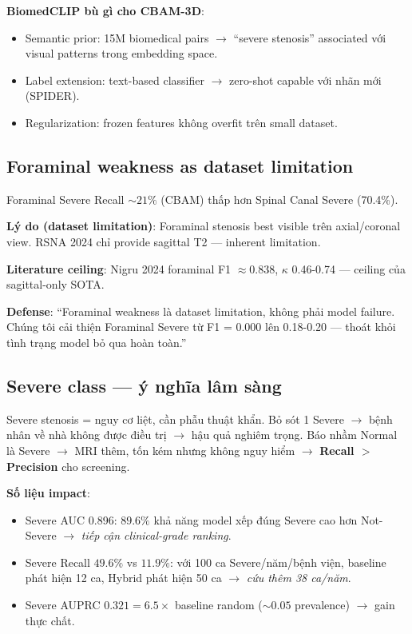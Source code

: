 \documentclass[11pt,a4paper]{article}
\begin{document}
\noindent\textbf{BiomedCLIP bù gì cho CBAM-3D}:
\begin{itemize}[leftmargin=*]
\item Semantic prior: 15M biomedical pairs $\to$ ``severe stenosis''
associated với visual patterns trong embedding space.
\item Label extension: text-based classifier $\to$ zero-shot capable
với nhãn mới (SPIDER).
\item Regularization: frozen features không overfit trên small dataset.
\end{itemize}

\subsection{Foraminal weakness as dataset limitation}

\noindent Foraminal Severe Recall $\sim 21\%$ (CBAM) thấp hơn Spinal
Canal Severe (70.4\%).

\noindent\textbf{Lý do (dataset limitation)}: Foraminal stenosis best
visible trên axial/coronal view. RSNA 2024 chỉ provide sagittal T2 ---
inherent limitation.

\noindent\textbf{Literature ceiling}: Nigru 2024 foraminal F1 $\approx
0.838$, $\kappa$ 0.46-0.74 --- ceiling của sagittal-only SOTA.

\noindent\textbf{Defense}: ``Foraminal weakness là dataset limitation,
không phải model failure. Chúng tôi cải thiện Foraminal Severe từ F1 =
0.000 lên 0.18-0.20 --- thoát khỏi tình trạng model bỏ qua hoàn toàn.''

\subsection{Severe class --- ý nghĩa lâm sàng}

\noindent Severe stenosis = nguy cơ liệt, cần phẫu thuật khẩn. Bỏ sót
1 Severe $\to$ bệnh nhân về nhà không được điều trị $\to$ hậu quả
nghiêm trọng. Báo nhầm Normal là Severe $\to$ MRI thêm, tốn kém nhưng
không nguy hiểm $\to$ \textbf{Recall $>$ Precision} cho screening.

\noindent\textbf{Số liệu impact}:
\begin{itemize}[leftmargin=*]
\item Severe AUC 0.896: $89.6\%$ khả năng model xếp đúng Severe cao
hơn Not-Severe $\to$ \emph{tiếp cận clinical-grade ranking}.
\item Severe Recall $49.6\%$ vs $11.9\%$: với 100 ca Severe/năm/bệnh
viện, baseline phát hiện 12 ca, Hybrid phát hiện 50 ca $\to$ \emph{cứu
thêm 38 ca/năm}.
\item Severe AUPRC $0.321 = 6.5 \times$ baseline random ($\sim 0.05$
prevalence) $\to$ gain thực chất.
\end{itemize}
\end{document}
